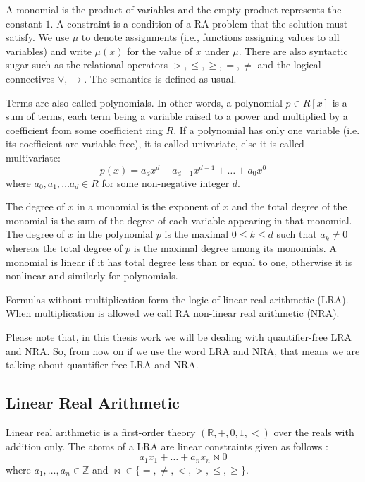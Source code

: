 \noindent A monomial is the product of variables and the empty product represents the constant $1$. 
A constraint is a condition of a RA problem that the solution must satisfy.
We use $\mu$ to denote assignments (i.e., functions assigning values to all variables) and write $\mu (x)$ for the value of $x$ under $\mu$.
There are also syntactic sugar such as the relational operators $>, \leq, \geq, =, \neq$ and the logical connectives $\vee, \to$.
The semantics is defined as usual.\newline

\noindent Terms are also called polynomials.
In other words, a polynomial $p\in R[x]$ is a sum of terms, each term being a variable raised to a power and multiplied by a coefficient from some coefficient ring $R$.
If a polynomial has only one variable (i.e. its coefficient are variable-free), it is called univariate, else it is called multivariate: 
$$ p(x) = a_{d}x^{d} + a_{d-1}x^{d-1} + \ldots + a_{0}x^{0} $$
where $a_{0}, a_{1}, \ldots a_{d} \in R$ for some non-negative integer $d$.\newline

\noindent The degree of $x$ in a monomial is the exponent of $x$ and the total degree of the monomial is the sum of the degree of each variable appearing in that monomial.
The degree of $x$ in the polynomial $p$ is the maximal $0\leq k\leq d$ such that $a_{k}\neq 0$ whereas the total degree of $p$ is the maximal degree among its monomials.\newline
A monomial is linear if it has total degree less than or equal to one, otherwise it is nonlinear and similarly for polynomials.\newline

\noindent Formulas without multiplication form the logic of linear real arithmetic (LRA).
When multiplication is allowed we call RA non-linear real arithmetic (NRA).\newline

\noindent Please note that, in this thesis work we will be dealing with quantifier-free LRA and NRA.
So, from now on if we use the word LRA and NRA, that means we are talking about quantifier-free LRA and NRA.
\subsection{Linear Real Arithmetic}
\label{subsec:LRA}
Linear real arithmetic is a first-order theory $(\mathbb{R}, +, 0, 1, <)$ over the reals with addition only.
The atoms of a LRA are linear constraints given as follows \cite{LATUM}:
$$ a_{1}x_{1} + \ldots + a_{n}x_{n} \bowtie 0 $$
where $ a_{1}, \ldots, a_{n} \in \mathbb{Z} $ and $ \bowtie \in \{=, \neq, <, >, \leq, \geq \} $.\newline

